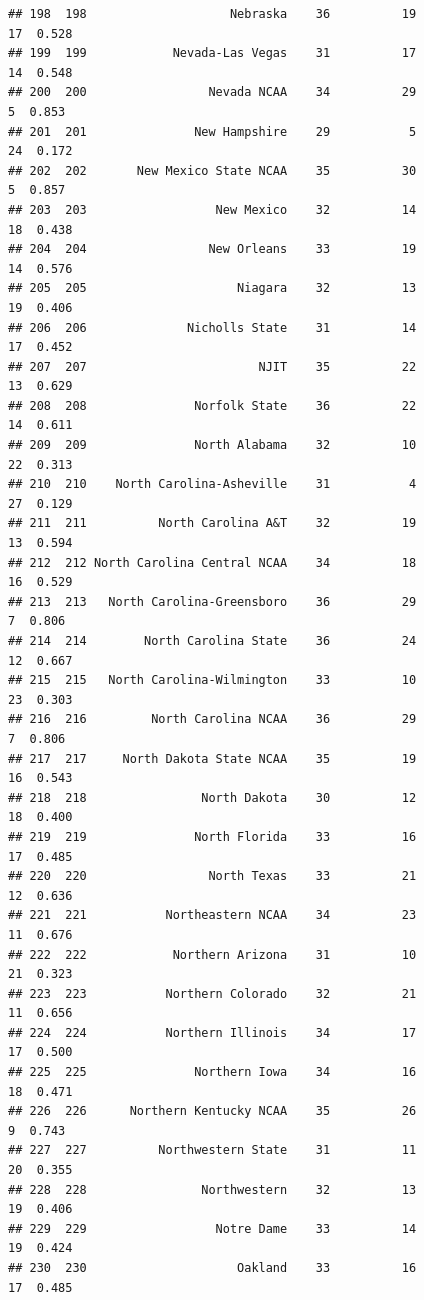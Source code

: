 \documentclass[]{book}
\begin{document}
\begin{verbatim}
## 198  198                    Nebraska    36          19            17  0.528
## 199  199            Nevada-Las Vegas    31          17            14  0.548
## 200  200                 Nevada NCAA    34          29             5  0.853
## 201  201               New Hampshire    29           5            24  0.172
## 202  202       New Mexico State NCAA    35          30             5  0.857
## 203  203                  New Mexico    32          14            18  0.438
## 204  204                 New Orleans    33          19            14  0.576
## 205  205                     Niagara    32          13            19  0.406
## 206  206              Nicholls State    31          14            17  0.452
## 207  207                        NJIT    35          22            13  0.629
## 208  208               Norfolk State    36          22            14  0.611
## 209  209               North Alabama    32          10            22  0.313
## 210  210    North Carolina-Asheville    31           4            27  0.129
## 211  211          North Carolina A&T    32          19            13  0.594
## 212  212 North Carolina Central NCAA    34          18            16  0.529
## 213  213   North Carolina-Greensboro    36          29             7  0.806
## 214  214        North Carolina State    36          24            12  0.667
## 215  215   North Carolina-Wilmington    33          10            23  0.303
## 216  216         North Carolina NCAA    36          29             7  0.806
## 217  217     North Dakota State NCAA    35          19            16  0.543
## 218  218                North Dakota    30          12            18  0.400
## 219  219               North Florida    33          16            17  0.485
## 220  220                 North Texas    33          21            12  0.636
## 221  221           Northeastern NCAA    34          23            11  0.676
## 222  222            Northern Arizona    31          10            21  0.323
## 223  223           Northern Colorado    32          21            11  0.656
## 224  224           Northern Illinois    34          17            17  0.500
## 225  225               Northern Iowa    34          16            18  0.471
## 226  226      Northern Kentucky NCAA    35          26             9  0.743
## 227  227          Northwestern State    31          11            20  0.355
## 228  228                Northwestern    32          13            19  0.406
## 229  229                  Notre Dame    33          14            19  0.424
## 230  230                     Oakland    33          16            17  0.485

\end{verbatim}
\end{document}

